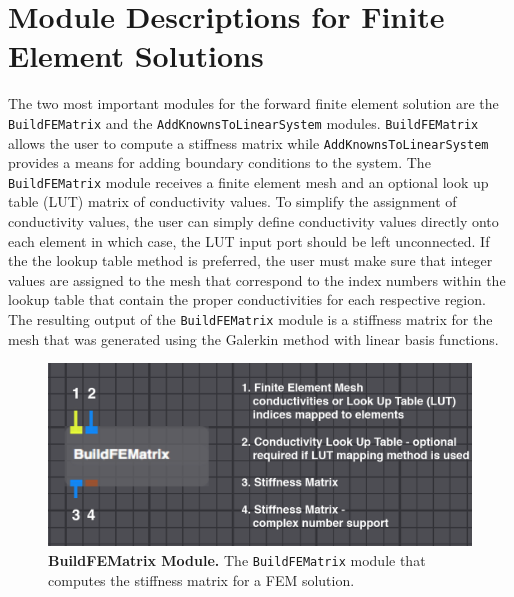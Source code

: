 \newpage

\section{Module Descriptions for Finite Element Solutions}

The two most important modules for the forward finite element solution are the {\tt BuildFEMatrix}
and the {\tt AddKnownsToLinearSystem} modules. {\tt BuildFEMatrix} allows the user to compute a stiffness matrix while {\tt AddKnownsToLinearSystem} provides a means for adding boundary conditions to the system. 
The {\tt BuildFEMatrix} module receives a finite element mesh and an optional look up table (LUT) matrix of conductivity values.  
To simplify the assignment of conductivity values, the user can simply define conductivity values directly onto each element in which case, the LUT input port should be left unconnected.  
If the the lookup table method is preferred, the user must make sure that integer values are assigned to the mesh that correspond to the index numbers within the lookup table that contain the proper conductivities for each respective region. 
The resulting output of the {\tt BuildFEMatrix} module is a stiffness matrix for the mesh that was generated using the Galerkin method with linear basis functions.

\begin{figure}[t]
\begin{center}
\includegraphics[width=.8\textwidth]{ECGToolkitGuide_figures/BuildFEMatrix.png}
\caption{{\bf BuildFEMatrix Module.} The {\tt BuildFEMatrix} module that computes the stiffness matrix for a FEM solution.}
\label{fig:FEM}
\end{center}
\end{figure}

